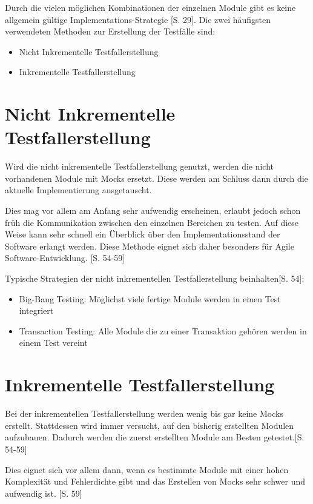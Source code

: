 \documentclass[a4paper,bibtotoc,oneside]{scrbook}
\begin{document}
Durch die vielen möglichen Kombinationen der einzelnen Module gibt es keine allgemein gültige Implementations-Strategie \cite{betrieb}[S. 29]. Die zwei häufigsten verwendeten Methoden zur Erstellung der Testfälle sind:

\begin{itemize}
	\item Nicht Inkrementelle Testfallerstellung
	\item Inkrementelle Testfallerstellung
\end{itemize}

\section{Nicht Inkrementelle Testfallerstellung}
Wird die nicht inkrementelle Testfallerstellung genutzt, werden die nicht vorhandenen Module mit Mocks ersetzt. Diese werden am Schluss dann durch die aktuelle Implementierung ausgetauscht.

Dies mag vor allem am Anfang sehr aufwendig erscheinen, erlaubt jedoch schon früh die Kommunikation zwischen den einzelnen Bereichen zu testen. Auf diese Weise kann sehr schnell ein Überblick über den Implementationsstand der Software erlangt werden. Diese Methode eignet sich daher besonders für Agile Software-Entwicklung. \cite{test_large_systems}[S. 54-59] 

Typische Strategien der nicht inkrementellen Testfallerstellung beinhalten\cite{test_large_systems}[S. 54]:

\begin{itemize}
  \item Big-Bang Testing: Möglichst viele fertige Module werden in einen Test integriert
  \item Transaction Testing: Alle Module die zu einer Transaktion gehören werden in einem Test vereint
\end{itemize}


\section{Inkrementelle Testfallerstellung}
Bei der inkrementellen Testfallerstellung werden wenig bis gar keine Mocks erstellt. Stattdessen wird immer versucht, auf den bisherig erstellten Modulen aufzubauen. Dadurch werden die zuerst erstellten Module am Besten getestet.\cite{test_large_systems}[S. 54-59]

Dies eignet sich vor allem dann, wenn es bestimmte Module mit einer hohen Komplexität und Fehlerdichte gibt und das Erstellen von Mocks sehr schwer und aufwendig ist. \cite{test_large_systems}[S. 59]
\end{document}
